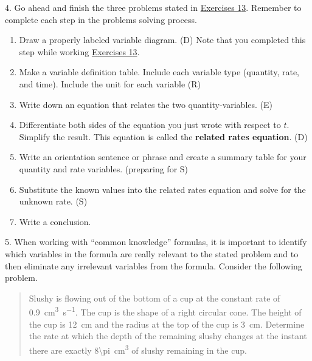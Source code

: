 \documentclass[12pt,]{book}
\newcommand{\terminology}[1]{\textbf{#1}}
\newcommand{\acronym}[1]{#1}
\theoremstyle{plain}
\theoremstyle{definition}
\numberwithin{equation}{section}
\begin{document}
\par\smallskip\noindent
\begin{exerciselist}
\item[4.]\hypertarget{exercise-553}{\null}Go ahead and finish the three problems stated in \hyperlink{exercise-triangle-first}{Exercises 1}\textendash{}\hyperlink{exercise-triangle-last}{3}. Remember to complete each step in the problems solving process.%
\begin{enumerate}[label=(\alph*)]
\item{}Draw a properly labeled variable diagram. (\acronym{D}) Note that you completed this step while working \hyperlink{exercise-triangle-first}{Exercises 1}\textendash{}\hyperlink{exercise-triangle-last}{3}.\item{}Make a variable definition table. Include each variable type (quantity, rate, and time). Include the unit for each variable (\acronym{R})\item{}Write down an equation that relates the two quantity-variables. (\acronym{E})\item{}Differentiate both sides of the equation you just wrote with respect to \(t\). Simplify the result. This equation is called the \terminology{related rates equation}. (\acronym{D})\item{}Write an orientation sentence or phrase and create a summary table for your quantity and rate variables. (preparing for \acronym{S})\item{}Substitute the known values into the related rates equation and solve for the unknown rate. (\acronym{S})\item{}Write a conclusion.\end{enumerate}
\par\smallskip
\item[5.]\hypertarget{exercise-554}{\null}When working with ``common knowledge'' formulas, it is important to identify which variables in the formula are really relevant to the stated problem and to then eliminate any irrelevant variables from the formula. Consider the following problem. \begin{quote}Slushy is flowing out of the bottom of a cup at the constant rate of \SI{0.9}{\centi\meter\tothe{3}\per\second}. The cup is the shape of a right circular cone. The height of the cup is \SI{12}{\centi\meter} and the radius at the top of the cup is \SI{3}{\centi\meter}. Determine the rate at which the depth of the remaining slushy changes at the instant there are exactly \SI{8\pi}{\centi\meter\tothe{3}} of slushy remaining in the cup.\end{quote}%

\end{exerciselist}
\end{document}

